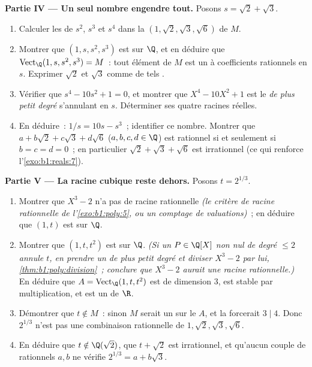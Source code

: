 \begin{problem}
\medskip
\noindent\textbf{Partie IV --- Un seul nombre engendre tout.}
Posons $s = \sqrt2 + \sqrt3$.
\begin{enumerate}[resume]
  \item Calculer les  de $s^2$, $s^3$ et $s^4$ dans la
         $(1, \sqrt2, \sqrt3, \sqrt6)$ de $M$.
  \item Montrer que $(1, s, s^2, s^3)$ est  sur $\Q$, et en
        déduire que $\operatorname{Vect}_\Q(1, s, s^2, s^3) = M$~:
        tout élément de $M$ est un  à coefficients rationnels
        en $s$. Exprimer $\sqrt2$ et $\sqrt3$ comme de tels .
  \item Vérifier que $s^4 - 10s^2 + 1 = 0$, et montrer que $X^4 -
        10X^2 + 1$ est le \emph{ de plus petit
        degré} s'annulant en $s$. Déterminer ses quatre racines
        réelles.
  \item En déduire~: $1/s = 10s - s^3$~; identifier ce nombre. Montrer
        que $a + b\sqrt2 + c\sqrt3 + d\sqrt6$ ($a,b,c,d \in \Q$)
        est rationnel si et seulement si $b = c = d = 0$~; en
        particulier $\sqrt2 + \sqrt3 + \sqrt6$ est irrationnel
        (ce qui renforce l'\cref{exo:b1:reals:7}).
\end{enumerate}

\medskip
\noindent\textbf{Partie V --- La racine cubique reste dehors.} Posons
$t = 2^{1/3}$.
\begin{enumerate}[resume]
  \item Montrer que $X^3 - 2$ n'a pas de racine rationnelle \emph{(le
        critère de racine rationnelle de l'\cref{exo:b1:poly:5}, ou un
        comptage de valuations)}~; en déduire que $(1, t)$ est 
        sur $\Q$.
  \item Montrer que $(1, t, t^2)$ est  sur $\Q$. \emph{(Si un
        $P \in \Q[X]$ non nul de degré $\leq 2$ annule $t$, en prendre
        un de plus petit degré et diviser $X^3 - 2$ par lui,
        \cref{thm:b1:poly:division}~; conclure que $X^3 - 2$ aurait
        une racine rationnelle.)} En déduire que $A =
        \operatorname{Vect}_\Q(1, t, t^2)$ est de dimension $3$, est
        stable par multiplication, et est un  de $\R$.
  \item Démontrer que $t \notin M$~: sinon $M$ serait un  sur le  $A$, et la  forcerait
        $3 \mid 4$. Donc $2^{1/3}$ n'est pas une combinaison
        rationnelle de $1, \sqrt2, \sqrt3, \sqrt6$.
  \item En déduire que $t \notin \Q(\sqrt2)$, que $t + \sqrt2$ est
        irrationnel, et qu'aucun couple de rationnels $a, b$ ne vérifie
        $2^{1/3} = a + b\sqrt3$.
\end{enumerate}


\end{problem}
